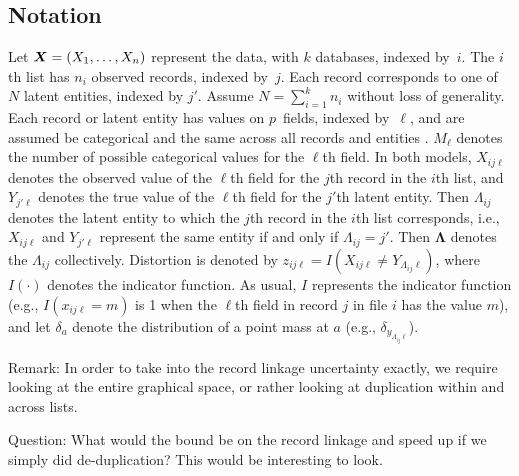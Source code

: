 \documentclass[twoside]{article}
\begin{document}
\subsection{Notation}
\label{sec:notation}
{Let $\bm{X}=(X_1,\ldots,X_n)$} represent the data, with $k$ databases, indexed by~$i$.  The $i$th list has $n_i$ observed records, indexed by~$j$.  Each record corresponds to one of $N$ latent entities, indexed by $j'.$ Assume
 $N=\sum_{i=1}^k n_i$ without loss of generality.
Each record or latent entity has values on $p$~fields, indexed by~$\ell$, and are assumed  be categorical and the same across all records and entities \cite{steorts14smered,steorts??bayesian}.
$M_\ell$ denotes the number of possible categorical values for the $\ell$th field.
%
In both models, $X_{ij\ell}$ denotes the
observed value of the $\ell$th field for the $j$th record in the $i$th list,
and $Y_{j'\ell}$ denotes the true value of the $\ell$th field for the $j'$th latent
entity. Then $\Lambda_{ij}$ denotes the latent entity to which the
$j$th record in the $i$th list corresponds, i.e., $X_{ij\ell}$ and $Y_{j'\ell}$
represent the same entity if and only if $\Lambda_{ij}=j'$.
%
Then $\bm\Lambda$ denotes the $\Lambda_{ij}$ collectively.
Distortion is denoted by $z_{ij\ell}=I(X_{ij\ell}\ne Y_{\Lambda_{ij}\ell})$,
where $I(\cdot)$ denotes the indicator function.
As usual,  $I$ represents the indicator function (e.g., $I(x_{ij\ell}=m)$ is 1 when
the $\ell$th field in record $j$ in file $i$ has the value $m$),
and let $\delta_a$ denote the distribution of a point mass at $a$ (e.g., $\delta_{y_{\Lambda_{ij}\ell}}$). 

Remark: In order to take into the record linkage uncertainty exactly, we require looking at the entire graphical space, or rather looking at duplication within and across lists. 

Question: What would the bound be on the record linkage and speed up if we simply did de-duplication? This would be interesting to look. 
\end{document}
